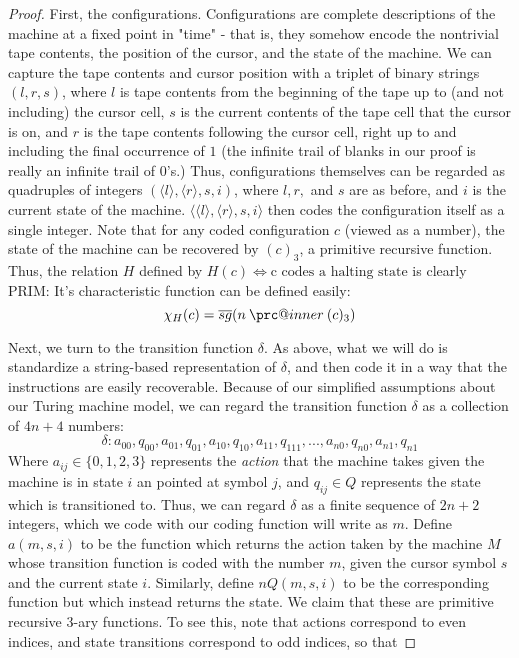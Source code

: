 \documentclass{article}
\makeatletter
\newcommand{\prc}{\mathbin{\mathpalette\prc@inner\relax}}
\newcommand{\prc@inner}[2]{%
  \vbox{\offinterlineskip\m@th
    \ialign{%
      ##\cr
      \hidewidth\raisebox{-1.5\height}[0pt][0pt]{$#1.$}\hidewidth\cr
      $#1-$\cr
    }%
  }%
}
\theoremstyle{definition}
\theoremstyle{plain}
\theoremstyle{theorem}
\makeatother
\begin{document}
\begin{proof}
    \par First, the configurations. Configurations are complete descriptions of the machine at a fixed point in "time" - that is, they somehow encode the nontrivial tape contents, the position of the cursor, and the state of the machine. We can capture the tape contents and cursor position with a triplet of binary strings $(l,r,s)$, where $l$ is tape contents from the beginning of the tape up to (and not including) the cursor cell, $s$ is the current contents of the tape cell that the cursor is on, and $r$ is the tape contents following the cursor cell, right up to and including the final occurrence of $1$ (the infinite trail of blanks in our proof is really an infinite trail of $0$'s.) Thus, configurations themselves can be regarded as quadruples of integers $(\langle l \rangle,\langle r \rangle,s,i)$, where $l,r,$ and $s$ are as before, and $i$ is the current state of the machine. $\langle \langle l \rangle,\langle r \rangle,s,i \rangle$ then codes the configuration itself as a single integer. Note that for any coded configuration $c$ (viewed as a number), the state of the machine can be recovered by $(c)_3$, a primitive recursive function. Thus, the relation $H$ defined by $H(c) \iff \textrm{c codes a halting state}$ is clearly PRIM: It's characteristic function can be defined easily: 
    \[\chi_H(c) = \overline{sg}(n \prc (c)_3) \]
    \par Next, we turn to the transition function $\delta$. As above, what we will do is standardize a string-based representation of $\delta$, and then code it in a way that the instructions are easily recoverable. Because of our simplified assumptions about our Turing machine model, we can regard the transition function $\delta$ as a collection of $4n+4$ numbers:
    \[ \delta: a_{00},q_{00},a_{01},q_{01},a_{10},q_{10},a_{11},q_{111},...,a_{n0},q_{n0},a_{n1},q_{n1} \]
    Where $a_{ij} \in \{0,1,2,3\}$ represents the \textit{action} that the machine takes given the machine is in state $i$ an pointed at symbol $j$, and $q_{ij} \in Q$ represents the state which is transitioned to. Thus, we can regard $\delta$ as a finite sequence of $2n+2$ integers, which we code with our coding function will write as $m$. Define $a(m,s,i)$ to be the function which returns the action taken by the machine $M$ whose transition function is coded with the number $m$, given the cursor symbol $s$ and the current state $i$. Similarly, define $nQ(m,s,i)$ to be the corresponding function but which instead returns the state. We claim that these are primitive recursive $3$-ary functions. To see this, note that actions correspond to even indices, and state transitions correspond to odd indices, so that

\end{proof}
\end{document}
